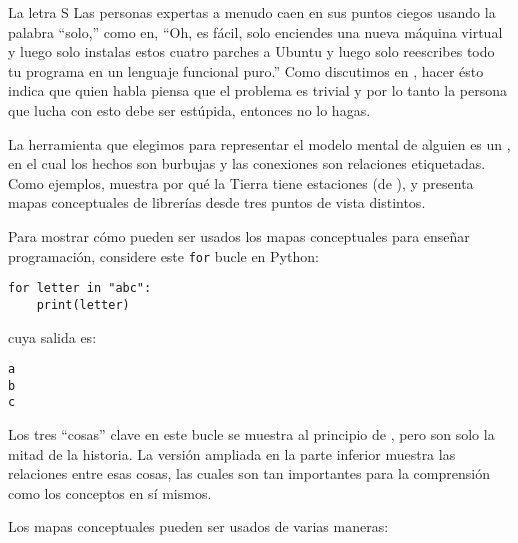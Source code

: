 \begin{aside}{La letra S}
 Las personas expertas a menudo caen en sus puntos ciegos usando la palabra ``solo,''
  como en,
  ``Oh, es fácil, solo enciendes una nueva máquina virtual
  y luego solo instalas estos cuatro parches a Ubuntu
  y luego solo reescribes todo tu programa en un lenguaje funcional puro.''
  Como discutimos en ,
  hacer ésto indica que quien habla piensa que el problema es trivial
  y por lo tanto la persona que lucha con esto debe ser estúpida,
  entonces no lo hagas.


\end{aside}


La herramienta que elegimos para representar el modelo mental de alguien es un ,
en el cual los hechos son burbujas y las conexiones son relaciones etiquetadas.
Como ejemplos,
 muestra por qué la Tierra tiene estaciones (de ),
y  presenta mapas conceptuales de librerías desde tres puntos de vista distintos.


Para mostrar cómo pueden ser usados los mapas conceptuales para enseñar programación,
considere este \texttt{for} bucle en Python:

\begin{verbatim}
for letter in "abc":
    print(letter)
\end{verbatim}

\noindent
cuya salida es:

\begin{verbatim}
a
b
c
\end{verbatim}

Los tres ``cosas'' clave en este bucle se muestra al principio de  ,
pero son solo la mitad de la historia.
La versión ampliada en la parte inferior muestra las relaciones entre esas cosas,
las cuales son tan importantes para la comprensión como los conceptos en sí mismos.


\newpage
Los mapas conceptuales pueden ser usados de varias maneras:

